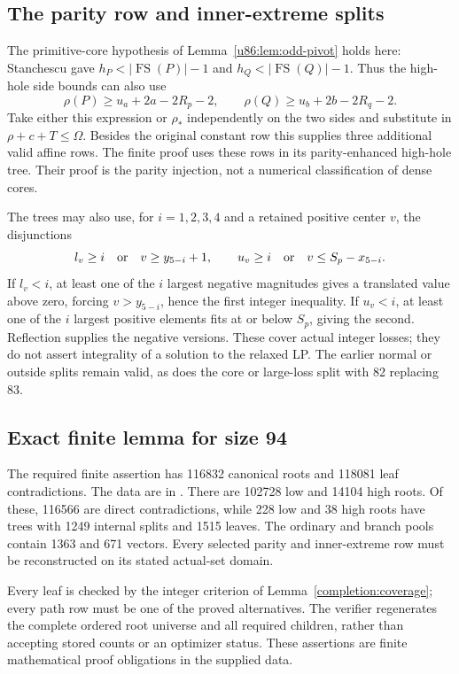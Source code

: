 \documentclass[11pt,a4paper]{article}
\theoremstyle{remark}
\newcommand{\FS}{\operatorname{FS}}
\begin{document}
\subsection{The parity row and inner-extreme splits}
The primitive-core hypothesis of Lemma~\ref{u86:lem:odd-pivot} holds here:
Stanchescu gave $h_P<|\FS(P)|-1$ and $h_Q<|\FS(Q)|-1$.
Thus the high-hole side bounds can also use
\[
 \rho(P)\ge u_a+2a-2R_p-2,\qquad
 \rho(Q)\ge u_b+2b-2R_q-2.
\]
Take either this expression or $\rho_*$ independently on the two sides
and substitute in $\rho+c+T\le\Omega$. Besides the original constant
row this supplies three additional valid affine rows. The finite proof
uses these rows in its parity-enhanced high-hole tree. Their proof is
the parity injection, not a numerical classification of dense cores.

The trees may also use, for $i=1,2,3,4$ and a retained positive center
$v$, the disjunctions
\[
 l_v\ge i\quad\hbox{or}\quad v\ge y_{5-i}+1,
 \qquad
 u_v\ge i\quad\hbox{or}\quad v\le S_p-x_{5-i}.
\]
If $l_v<i$, at least one of the $i$ largest negative magnitudes gives
a translated value above zero, forcing $v>y_{5-i}$, hence the first
integer inequality. If $u_v<i$, at least one of the $i$ largest positive
elements fits at or below $S_p$, giving the second. Reflection supplies
the negative versions. These cover actual integer losses; they do not
assert integrality of a solution to the relaxed LP. The earlier normal
or outside splits remain valid, as does the core or large-loss split
with 82 replacing 83.


\subsection{Exact finite lemma for size 94}
\label{u86:finite:94}
The required finite assertion has 116832 canonical roots and 118081
leaf contradictions. The data are in .
There are 102728 low and 14104 high roots. Of these, 116566 are direct
contradictions, while 228 low and 38 high roots have trees with 1249
internal splits and 1515 leaves. The ordinary and branch pools contain
1363 and 671 vectors. Every selected parity and inner-extreme row must
be reconstructed on its stated actual-set domain.

Every leaf is checked by the integer criterion of
Lemma~\ref{completion:coverage}; every path row must be one of the
proved alternatives. The verifier  regenerates
the complete ordered root universe and all required children, rather than
accepting stored counts or an optimizer status. These assertions are finite
mathematical proof obligations in the supplied data.
\end{document}
